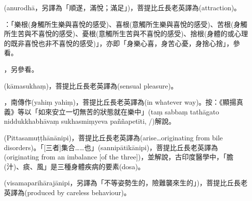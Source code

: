 \startitemgroup[noteitems]
\item{}(anurodhā，另譯為「順遂，滿悅；滿足」)，菩提比丘長老英譯為(attraction)。
\stopitemgroup

\startitemgroup[noteitems]
\item{}：「樂根(身觸所生樂與喜悅的感受)、喜根(意觸所生樂與喜悅的感受)、苦根(身觸所生苦與不喜悅的感受)、憂根(意觸所生苦與不喜悅的感受)、捨根(身體的或心理的既非喜悅也非不喜悅的感受)」，亦即「身樂心喜，身苦心憂，身捨心捨」，參看。
\stopitemgroup

\startitemgroup[noteitems]
\item{}，另參看。
\stopitemgroup

\startitemgroup[noteitems]
\item{}(kāmasukhaṃ)，菩提比丘長老英譯為(sensual pleasure)。
\stopitemgroup

\startitemgroup[noteitems]
\item{}，南傳作(yahiṃ yahiṃ)，菩提比丘長老英譯為(in whatever way)。按：《顯揚真義》等以「如來安立一切無苦的狀態就在樂中」(taṃ sabbaṃ tathāgato niddukkhabhāvaṃ sukhasmiṃyeva paññapetīti, /)解說。
\stopitemgroup

\startitemgroup[noteitems]
\item{}(Pittasamuṭṭhānānipi)，菩提比丘長老英譯為(arise…originating from bile disorders)。「[三者]集合……也」(sannipātikānipi)，菩提比丘長老英譯為(originating from an imbalance [of the three])，並解說，古印度醫學中，「膽(汁)、痰、風」是三種身體疾病的要素(dosa)。
\stopitemgroup

\startitemgroup[noteitems]
\item{}(visamaparihārajānipi，另譯為「不等姿勢生的，險難襲來生的」)，菩提比丘長老英譯為(produced by careless behaviour)。
\stopitemgroup

